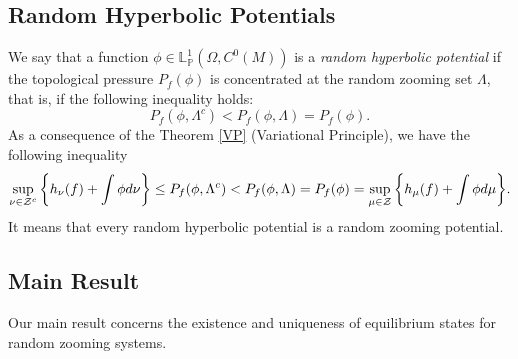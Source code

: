 \documentclass[12pt,a4paper]{amsart}
\theoremstyle{plain}
\newtheorem{remark}{Remark}
\begin{document}
	
	
	
	\subsection{Random Hyperbolic Potentials}
	
	We say that a function $\phi  \in \mathbb{L}^{1}_{\mathbb{P}}(\Omega,C^0(M))$ is a \emph{random hyperbolic potential} if the topological pressure $P_{f}(\phi)$ is concentrated at the random zooming set $\Lambda$, that is, if the following inequality holds:
	\begin{equation}
		\label{equationradhyperpoten}
		P_{f}(\phi,\Lambda^{c}) < P_{f}(\phi,\Lambda) = P_{f}(\phi).
	\end{equation}
	As a consequence of the Theorem \ref{VP} (Variational Principle), we have the following inequality
	\[
	\displaystyle \sup_{\nu \in \mathcal{Z}^{c}}\bigg{\{} h_{\nu}(f) + \int \phi d\nu \bigg{\}} \leq P_{f}(\phi,\Lambda^{c}) < P_{f}(\phi,\Lambda) = P_{f}(\phi) = \sup_{\mu \in \mathcal{Z}}\bigg{\{} h_{\mu}(f) + \int \phi d\mu \bigg{\}}. 
	\]
	It means that every random hyperbolic potential is a random zooming potential.
	
	\subsection{Main Result}
	
	Our main result concerns the existence and uniqueness of equilibrium states for random zooming systems.
	
\end{document}
